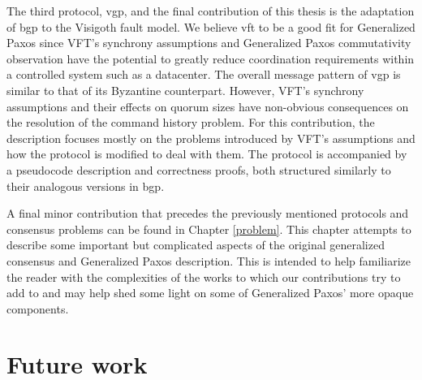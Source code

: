 The third protocol, \acrlong{vgp}, and the final contribution of this thesis is the adaptation of \acrshort{bgp} to the Visigoth fault model. We believe \acrshort{vft} to be a good fit for Generalized Paxos since VFT's synchrony assumptions and Generalized Paxos commutativity observation have the potential to greatly reduce coordination requirements within a controlled system such as a datacenter. The overall message pattern of \acrshort{vgp} is similar to that of its Byzantine counterpart. However, VFT's synchrony assumptions and their effects on quorum sizes have non-obvious consequences on the resolution of the command history problem. For this contribution, the description focuses mostly on the problems introduced by VFT's assumptions and how the protocol is modified to deal with them. The protocol is accompanied by a pseudocode description and correctness proofs, both structured similarly to their analogous versions in \acrshort{bgp}. \par
A final minor contribution that precedes the previously mentioned protocols and consensus problems can be found in Chapter \ref{problem}. This chapter attempts to describe some important but complicated aspects of the original generalized consensus and Generalized Paxos description. This is intended to help familiarize the reader with the complexities of the works to which our contributions try to add to and may help shed some light on some of Generalized Paxos' more opaque components.

\section{Future work}
